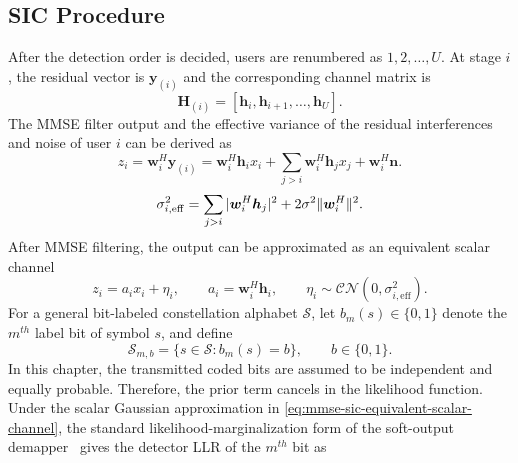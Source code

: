 \subsection{SIC Procedure}

After the detection order is decided, users are renumbered as $1,2,\ldots,U$. At stage $i$, the residual vector is $\bm{y}_{(i)}$ and the corresponding channel matrix is
\begin{equation}
    \label{eq:downsized channel matrix}
    \bm{H}_{(i)}=[\bm{h}_i,\bm{h}_{i+1},\ldots,\bm{h}_U].
\end{equation}
The MMSE filter output and the effective variance of the residual interferences and noise of user $i$ can be derived as 
\begin{equation}
    \label{eq:filter output stage i}
    z_{i}
    =
    \bm{w}_{i}^H \bm{y}_{(i)}
    =
    \bm{w}_{i}^H \bm{h}_{i} x_{i}
    +
    \sum_{j > i} \bm{w}_{i}^H \bm{h}_j x_j
    +
    \bm{w}_{i}^H \bm{n}.
\end{equation}
\begin{equation}
	\label{eq:effective noise stage i}
    \sigma_{i,\rm eff}^2
    =
    \sum_{j > i}
    |\bm{w}_{i}^H \bm{h}_j|^2
    +
    2\sigma^2 \|\bm{w}_{i}^H \|^2.
\end{equation}
After MMSE filtering, the output can be approximated as an equivalent scalar channel
\begin{equation}
    z_i = a_i x_i+\eta_i,
    \qquad
    a_i=\bm{w}_i^H\bm{h}_i,
    \qquad
    \eta_i\sim\mathcal{CN}(0,\sigma^2_{i,\mathrm{eff}}).
    \label{eq:mmse-sic-equivalent-scalar-channel}
\end{equation}
For a general bit-labeled constellation alphabet $\mathcal{S}$, let
$b_m(s)\in\{0,1\}$ denote the $m^{th}$ label bit of symbol $s$, and define
\begin{equation}
    \mathcal{S}_{m,b}
    =
    \{s\in\mathcal{S}: b_m(s)=b\},
    \qquad b\in\{0,1\}.
\end{equation}
In this chapter, the transmitted coded bits are assumed to be independent and equally probable. Therefore, the prior term cancels in the likelihood function. Under the scalar Gaussian approximation in \eqref{eq:mmse-sic-equivalent-scalar-channel}, the standard likelihood-marginalization form of the soft-output demapper~\cite{shapiro2005soft} gives the detector LLR of the $m^{th}$ bit as
